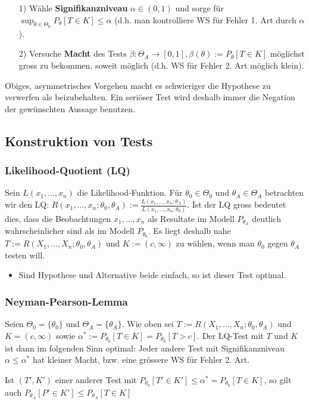 \begin{itemize}
        \begin{itemize}
            \item[1)] Wähle \textbf{Signifikanzniveau} $\alpha \in (0, 1)$ und sorge für $\sup_{\theta \in \Theta_0} P_\theta[T \in K] \le \alpha$ (d.h. man kontrolliere WS für Fehler 1. Art durch $\alpha$).
            \item[2)] Versuche \textbf{Macht} des Tests $\beta: \Theta_A \to [0, 1], \beta(\theta) := P_\theta[T \in K]$ möglichst gross zu bekommen, soweit möglich (d.h. WS für Fehler 2. Art möglich klein).
        \end{itemize}
    Obiges, asymmetrisches Vorgehen macht es schwieriger die Hypothese zu verwerfen als beizubehalten. Ein seriöser Test wird deshalb immer die Negation der gewünschten Aussage benutzen.
\end{itemize}

\subsection{Konstruktion von Tests}
\subsubsection{Likelihood-Quotient (LQ)}
Sein $L(x_1, \dots, x_n)$ die Likelihood-Funktion. Für $\theta_0 \in \Theta_0$ und $\theta_A \in \Theta_A$ betrachten wir den LQ: $R(x_1, \dots, x_n; \theta_0, \theta_A) := \frac{L(x_1, \dots, x_n; \theta_A)}{L(x_1, \dots, x_n; \theta_0)}$. Ist der LQ gross bedeutet dies, dass die Beobachtungen $x_1, \dots, x_n$ als Resultate im Modell $P_{\theta_A}$ deutlich wahrscheinlicher sind als im Modell $P_{\theta_0}$. Es liegt deshalb nahe $T:= R(X_1, \dots, X_n; \theta_0, \theta_A)$ und $K := (c, \infty)$ zu wählen, wenn man $\theta_0$ gegen $\theta_A$ testen will.
\begin{itemize}
    \item Sind Hypothese und Alternative beide einfach, so ist dieser Test optimal.
\end{itemize}

\subsubsection{Neyman-Pearson-Lemma}
Seien $\Theta_0 = \{\theta_0\}$ und $\Theta_A = \{\theta_A\}$. Wie oben sei $T := R(X_1, \dots, X_n; \theta_0, \theta_A)$ und $K = (c, \infty)$ sowie $\alpha^* := P_{\theta_0}[T \in K] = P_{\theta_0}[T > c]$. Der LQ-Test mit $T$ und $K$ ist dann im folgenden Sinn optimal: Jeder andere Test mit Signifikanzniveau $\alpha \le \alpha^*$ hat kleiner Macht, bzw. eine grössere WS für Fehler 2. Art.
\begin{itemize}
     Ist $(T', K')$ einer anderer Test mit $P_{\theta_0}[T' \in K'] \le \alpha^* = P_{\theta_0}[T \in K]$, so gilt auch $P_{\theta_A}[P' \in K'] \le P_{\theta_A}[T \in K]$
\end{itemize}

